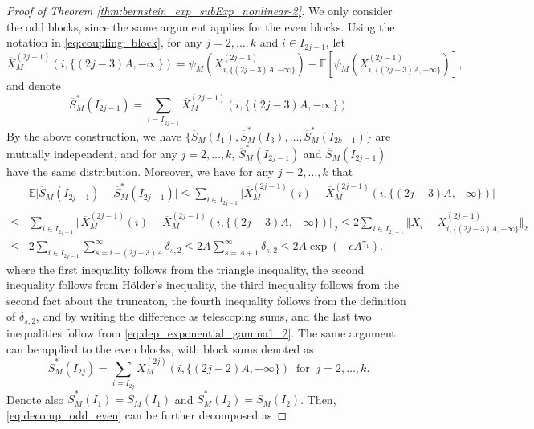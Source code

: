 \documentclass[11pt]{article}
\theoremstyle{plain}
\theoremstyle{definition}
\begin{document}
\begin{proof}[Proof of Theorem \ref{thm:bernstein_exp_subExp_nonlinear-2}]
We only consider the odd blocks, since the same argument applies for the even blocks. Using the notation in \eqref{eq:coupling_block}, for any $j = 2, \dots, k$ and $i \in I_{2j-1}$, let
\begin{equation*}
    \overline{X}_{M}^{(2j-1)}(i,\{(2j-3)A, -\infty\}) = \psi_{M}(X^{(2j-1)}_{i,\{(2j-3)A, -\infty\}}) - \mathbb{E}[\psi_M(X^{(2j-1)}_{i,\{(2j-3)A, -\infty\}})],
\end{equation*}
and denote
\begin{equation*}
    \overline{S}_M^*(I_{2j-1}) = \sum_{i = I_{2j-1}}\overline{X}_{M}^{(2j-1)}(i,\{(2j-3)A, -\infty\})
\end{equation*}
By the above construction, we have $\big\{\overline{S}_M(I_1), \overline{S}_M^*(I_{3}), \dots, \overline{S}_M^*(I_{2k-1})\big\}$ are mutually independent, and for any $j = 2,\dots, k$, $\overline{S}_M^*(I_{2j-1})$ and $\overline{S}_M(I_{2j-1})$ have the same distribution. Moreover, we have for any $j = 2,\dots, k$ that
\begin{align*}
    &\mathbb{E}\big|\overline{S}_M(I_{2j-1}) - \overline{S}^*_M(I_{2j-1})\big|\leq \sum_{i \in I_{2j-1}}\big| \overline{X}_M^{(2j-1)}(i) - \overline{X}_{M}^{(2j-1)}(i,\{(2j-3)A, -\infty\}) \big|\\
    \leq& \sum_{i \in I_{2j-1}}\big\Vert \overline{X}_M^{(2j-1)}(i) - \overline{X}_{M}^{(2j-1)}(i,\{(2j-3)A, -\infty\}) \big\Vert_2 \leq 2\sum_{i \in I_{2j-1}}\big\Vert X_i - X^{(2j-1)}_{i,\{(2j-3)A, -\infty\}} \big\Vert_2 \\
    \leq& 2\sum_{i \in I_{2j-1}}\sum_{s = i-(2j-3)A}^{\infty}\delta_{s,2} \leq 2A\sum_{s = A+1}^{\infty}\delta_{s,2} \leq 2A\exp(-cA^{\gamma_1}).
\end{align*}
where the first inequality follows from the triangle inequality, the second inequality follows from H\"older's inequality, the third inequality follows from the second fact about the truncaton, the fourth inequality follows from the definition of $\delta_{s,2}$, and by writing the difference as telescoping sums, and the last two inequalities follow from \eqref{eq:dep_exponential_gamma1_2}. The same argument can be applied to the even blocks, with block sums denoted as
\begin{equation*}
    \overline{S}_M^*(I_{2j}) = \sum_{i = I_{2j}}\overline{X}_{M}^{(2j)}(i,\{(2j-2)A, -\infty\}) \;\; \text{for} \;\; j = 2, \dots, k.
\end{equation*}
Denote also $\overline{S}^*_M(I_{1}) = \overline{S}_M(I_{1})$ and $\overline{S}^*_M(I_{2}) = \overline{S}_M(I_{2})$. Then, \eqref{eq:decomp_odd_even} can be further decomposed as

\end{proof}
\end{document}
